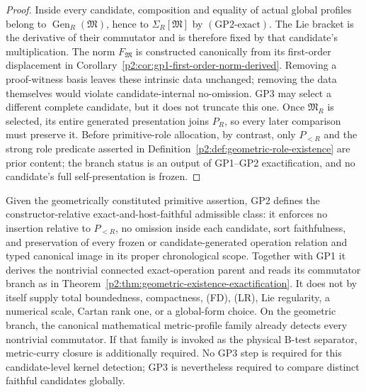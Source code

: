 \documentclass[11pt,a4paper]{article}
\begin{document}
\begin{proof}
Inside every candidate, composition and equality of actual global profiles
belong to \(\operatorname{Gen}_R(\mathfrak M)\), hence to
\(\Sigma_R[\mathfrak M]\) by \((\mathrm{GP2\text{-}exact})\).  The Lie bracket
is the derivative of their commutator and is therefore fixed by that
candidate's multiplication.  The norm \(F_{\mathfrak M}\) is constructed
canonically from its first-order displacement in
Corollary~\ref{p2:cor:gp1-first-order-norm-derived}.  Removing a proof-witness
basis leaves these intrinsic data unchanged; removing the data themselves
would violate candidate-internal no-omission.  GP3 may select a different
complete candidate, but it does not truncate this one.  Once
\(\mathfrak M_R\) is selected, its entire generated presentation joins
\(P_R\), so every later comparison must preserve it.  Before primitive-role
allocation, by contrast, only \(P_{<R}\) and the strong role predicate asserted
in Definition~\ref{p2:def:geometric-role-existence} are prior content; the
branch status is an output of GP1--GP2 exactification, and no candidate's full
self-presentation is frozen.
\end{proof}

\begin{corollary}
\label{p2:cor:gp2-no-existence-alone}
Given the geometrically constituted primitive assertion, GP2 defines the
constructor-relative exact-and-host-faithful admissible class: it enforces no
insertion relative to \(P_{<R}\), no omission inside each candidate, sort
faithfulness, and preservation of every frozen or candidate-generated
operation relation and typed canonical image in its proper chronological
scope.  Together with GP1 it
derives the nontrivial connected exact-operation parent and reads its
commutator branch as in
Theorem~\ref{p2:thm:geometric-existence-exactification}.  It does not by itself supply
total boundedness, compactness, (FD), (LR), Lie
regularity, a numerical scale, Cartan rank one, or a global-form choice.  On
the geometric branch, the canonical mathematical metric-profile family
already detects every nontrivial commutator.  If that family is invoked as
the physical B-test separator, metric-curry closure is additionally required.
No GP3 step is required for this candidate-level kernel detection; GP3 is
nevertheless required to compare distinct faithful candidates globally.
\end{corollary}
\end{document}
